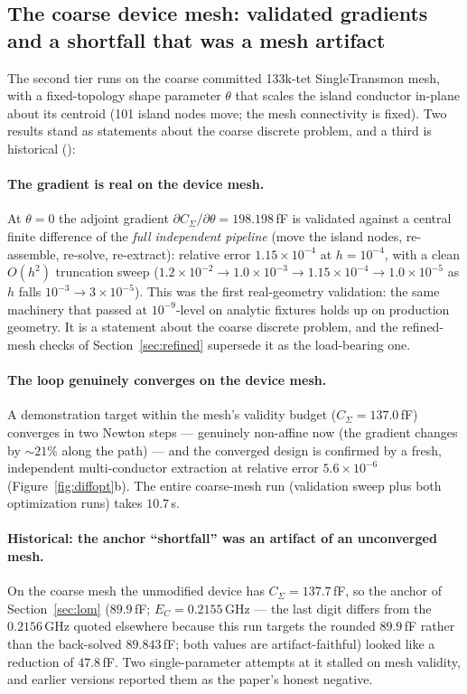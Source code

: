 \documentclass{anvil-paper}
\begin{document}
\subsection{The coarse device mesh: validated gradients and a shortfall that was a mesh artifact}
\label{sec:optdemo-pad}

The second tier runs on the coarse committed 133k-tet SingleTransmon
mesh, with a fixed-topology shape parameter $\theta$ that scales the
island conductor in-plane about its centroid (101 island nodes move;
the mesh connectivity is fixed). Two results stand as statements about
the coarse discrete problem, and a third is historical
():

\paragraph{The gradient is real on the device mesh.} At $\theta = 0$ the
adjoint gradient $\partial C_\Sigma/\partial\theta = 198.198$\,fF is
validated against a central finite difference of the \emph{full
independent pipeline} (move the island nodes, re-assemble, re-solve,
re-extract): relative error $1.15\times10^{-4}$ at $h = 10^{-4}$, with a
clean $O(h^2)$ truncation sweep ($1.2\times10^{-2} \to 1.0\times10^{-3}
\to 1.15\times10^{-4} \to 1.0\times10^{-5}$ as $h$ falls
$10^{-3} \to 3\times10^{-5}$). This was the first real-geometry
validation: the same machinery that passed at $10^{-9}$-level on
analytic fixtures holds up on production geometry. It is a statement
about the coarse discrete problem, and the refined-mesh checks of
Section~\ref{sec:refined} supersede it as the load-bearing one.

\paragraph{The loop genuinely converges on the device mesh.} A
demonstration target within the mesh's validity budget ($C_\Sigma =
137.0$\,fF) converges in two Newton steps --- genuinely non-affine now
(the gradient changes by ${\sim}21\%$ along the path) --- and the
converged design
is confirmed by a fresh, independent multi-conductor extraction at
relative error $5.6\times10^{-6}$ (Figure~\ref{fig:diffopt}b). The
entire coarse-mesh run (validation sweep plus both optimization runs)
takes $10.7$\,s.

\paragraph{Historical: the anchor ``shortfall'' was an artifact of an
unconverged mesh.}
On the coarse mesh the unmodified device has $C_\Sigma = 137.7$\,fF, so
the anchor of Section~\ref{sec:lom} ($89.9$\,fF; $E_C = 0.2155$\,GHz ---
the last digit differs from the $0.2156$\,GHz quoted elsewhere because
this run targets the rounded $89.9$\,fF rather than the back-solved
$89.843$\,fF; both values are artifact-faithful) looked like a
reduction of $47.8$\,fF. Two single-parameter attempts at it stalled on
mesh validity, and earlier versions reported them as the paper's honest
negative.
\end{document}
